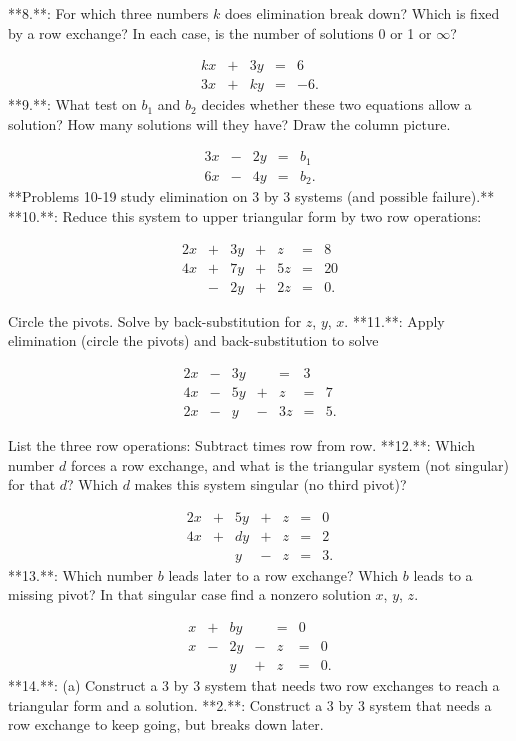 

**8.**: For which three numbers \(k\) does elimination break down? Which is fixed by a row exchange? In each case, is the number of solutions 0 or 1 or \(\infty\)?

\[\begin{array}{rclrcl}kx&+&3y&=&6\\ 3x&+&ky&=&-6.\end{array}\]
**9.**: What test on \(b_{1}\) and \(b_{2}\) decides whether these two equations allow a solution? How many solutions will they have? Draw the column picture.

\[\begin{array}{rclrcl}3x&-&2y&=&b_{1}\\ 6x&-&4y&=&b_{2}.\end{array}\]
**Problems 10-19 study elimination on 3 by 3 systems (and possible failure).**
**10.**: Reduce this system to upper triangular form by two row operations:

\[\begin{array}{rclrclrcl}2x&+&3y&+&z&=&8\\ 4x&+&7y&+&5z&=&20\\ &-&2y&+&2z&=&0.\end{array}\]

Circle the pivots. Solve by back-substitution for \(z\), \(y\), \(x\).
**11.**: Apply elimination (circle the pivots) and back-substitution to solve

\[\begin{array}{rclrclrcl}2x&-&3y&&=&3\\ 4x&-&5y&+&z&=&7\\ 2x&-&y&-&3z&=&5.\end{array}\]

List the three row operations: Subtract times row from row.
**12.**: Which number \(d\) forces a row exchange, and what is the triangular system (not singular) for that \(d\)? Which \(d\) makes this system singular (no third pivot)?

\[\begin{array}{rclrclrcl}2x&+&5y&+&z&=&0\\ 4x&+&dy&+&z&=&2\\ &&y&-&z&=&3.\end{array}\]
**13.**: Which number \(b\) leads later to a row exchange? Which \(b\) leads to a missing pivot? In that singular case find a nonzero solution \(x\), \(y\), \(z\).

\[\begin{array}{rclrclrclrcl}x&+&by&&=&0\\ x&-&2y&-&z&=&0\\ &&y&+&z&=&0.\end{array}\]
**14.**: (a) Construct a 3 by 3 system that needs two row exchanges to reach a triangular form and a solution.
**2.**: Construct a 3 by 3 system that needs a row exchange to keep going, but breaks down later.

